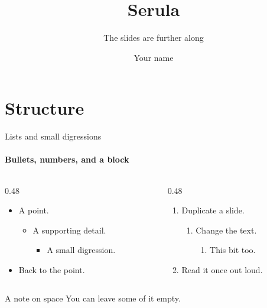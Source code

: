 \documentclass[aspectratio=169,14pt]{beamer}
\title[Serula]{Serula}
\subtitle{The slides are further along}
\author{Your name}
\institute{Department of unfinished business}
\date{}
\begin{document}
\begin{frame}[t,noframenumbering]
  \titlepage
\end{frame}

\section{Structure}
\begin{frame}[t]{Lists and small digressions}
  \framesubtitle{Bullets, numbers, and a block}
  \begin{columns}[T,onlytextwidth]
    \begin{column}{0.48\textwidth}
      \begin{itemize}
        \item A point.
          \begin{itemize}
            \item A supporting detail.
              \begin{itemize}
                \item A small digression.
              \end{itemize}
          \end{itemize}
        \item Back to the point.
      \end{itemize}
    \end{column}
    \begin{column}{0.48\textwidth}
      \begin{enumerate}
        \item Duplicate a slide.
          \begin{enumerate}
            \item Change the text.
              \begin{enumerate}
                \item This bit too.
              \end{enumerate}
          \end{enumerate}
        \item Read it once out loud.
      \end{enumerate}
    \end{column}
  \end{columns}
  \vspace{1mm}
  \begin{block}{A note on space}
    You can leave some of it empty.
  \end{block}
\end{frame}
\end{document}
